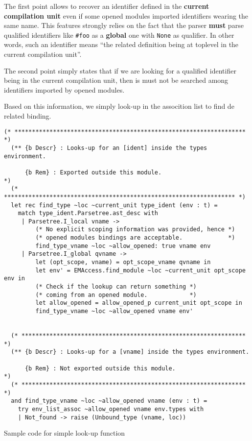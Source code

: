 The first point allows to recover an identifier defined in the
{\bf current compilation unit} even if some opened modules imported
identifiers wearing the same name. This features strongly relies on
the fact that the parser {\bf must} parse qualified identifiers like
{\tt \#foo} as a {\bf global} one with {\tt None} as qualifier. In
other words, such an identifier means ``the related definition being
at toplevel in the current compilation unit''.

The second point simply states that if we are looking for a qualified
identifier being in the current compilation unit, then is must not be
searched among identifiers imported by opened modules.

Based on this information, we simply look-up in the assocition list to
find de related binding.
{\scriptsize
\begin{lstlisting}[language=MyOCaml]
  (* ****************************************************************** *)
  (** {b Descr} : Looks-up for an [ident] inside the types environment.

      {b Rem} : Exported outside this module.                           *)
  (* ****************************************************************** *)
  let rec find_type ~loc ~current_unit type_ident (env : t) =
    match type_ident.Parsetree.ast_desc with
     | Parsetree.I_local vname ->
         (* No explicit scoping information was provided, hence *)
         (* opened modules bindings are acceptable.             *)
         find_type_vname ~loc ~allow_opened: true vname env
     | Parsetree.I_global qvname ->
         let (opt_scope, vname) = opt_scope_vname qvname in
         let env' = EMAccess.find_module ~loc ~current_unit opt_scope env in
         (* Check if the lookup can return something *)
         (* coming from an opened module.            *)
         let allow_opened = allow_opened_p current_unit opt_scope in
         find_type_vname ~loc ~allow_opened vname env'


  (* **************************************************************** *)
  (** {b Descr} : Looks-up for a [vname] inside the types environment.

      {b Rem} : Not exported outside this module.                     *)
  (* **************************************************************** *)
  and find_type_vname ~loc ~allow_opened vname (env : t) =
    try env_list_assoc ~allow_opened vname env.types with
    | Not_found -> raise (Unbound_type (vname, loc))
\end{lstlisting}
}{\sc Sample code for simple look-up function}


